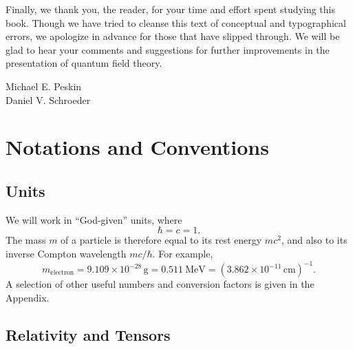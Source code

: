 Finally, we thank you, the reader, for your time and effort spent studying
this book.  Though we have tried to cleanse this text of conceptual and
typographical errors, we apologize in advance for those that have slipped
through.  We will be glad to hear your comments and suggestions for
further improvements in the presentation of quantum field theory.

\vspace{2em}
\noindent Michael E. Peskin\\
Daniel V. Schroeder

\chapter*{Notations and Conventions}

\section*{Units}

We will work in ``God-given'' units, where
\begin{equation}
  \hbar = c = 1 .
\end{equation}
The mass $m$ of a particle is therefore equal to its rest energy $mc^2$,
and also to its inverse Compton wavelength $mc/\hbar$.  For example,
\begin{equation}
  m_\mathrm{electron} = 9.109 \times 10^{-28}\,\mathrm{g}
    = 0.511\ \mathrm{MeV}
    = (3.862 \times 10^{-11}\,\mathrm{cm})^{-1} .
\end{equation}
A selection of other useful numbers and conversion factors is given in the
Appendix.

\section*{Relativity and Tensors}

